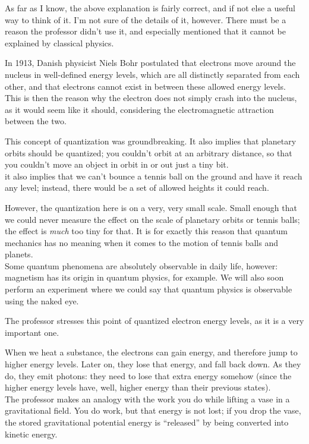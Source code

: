 As far as I know, the above explanation is fairly correct, and if not else a useful way to think of it. I'm not sure of the details of it, however. There must be a reason the professor didn't use it, and especially mentioned that it cannot be explained by classical physics.

In 1913, Danish physicist Niels Bohr postulated that electrons move around the nucleus in well-defined energy levels, which are all distinctly separated from each other, and that electrons cannot exist in between these allowed energy levels. This is then the reason why the electron does not simply crash into the nucleus, as it would seem like it should, considering the electromagnetic attraction between the two.

This concept of quantization was groundbreaking. It also implies that planetary orbits should be quantized; you couldn't orbit at an arbitrary distance, so that you couldn't move an object in orbit in or out just a tiny bit.\\
it also implies that we can't bounce a tennis ball on the ground and have it reach any level; instead, there would be a set of allowed heights it could reach.

However, the quantization here is on a very, very small scale. Small enough that we could never measure the effect on the scale of planetary orbits or tennis balls; the effect is \emph{much} too tiny for that. It is for exactly this reason that quantum mechanics has no meaning when it comes to the motion of tennis balls and planets.\\
Some quantum phenomena are absolutely observable in daily life, however: magnetism has its origin in quantum physics, for example. We will also soon perform an experiment where we could say that quantum physics is observable using the naked eye.

The professor stresses this point of quantized electron energy levels, as it is a very important one.

When we heat a substance, the electrons can gain energy, and therefore jump to higher energy levels. Later on, they lose that energy, and fall back down. As they do, they emit photons: they need to lose that extra energy somehow (since the higher energy levels have, well, higher energy than their previous states).\\
The professor makes an analogy with the work you do while lifting a vase in a gravitational field. You do work, but that energy is not lost; if you drop the vase, the stored gravitational potential energy is ``released'' by being converted into kinetic energy.

